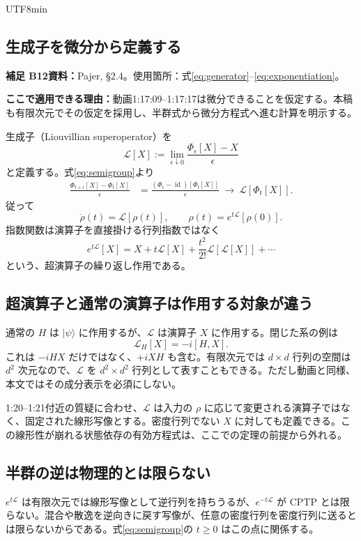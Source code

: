 \documentclass[11pt,a4paper]{article}
\numberwithin{equation}{section}
\newcommand{\id}{\operatorname{id}}
\newcommand{\ket}[1]{\lvert#1\rangle}
\newcommand{\supp}[3]{\par\smallskip\noindent\textcolor{BrickRed}{\textbf{補足 #1}}\quad\textbf{資料：}#2\par\noindent\textbf{ここで適用できる理由：}#3\par}
\begin{document}
\begin{CJK*}{UTF8}{min}
\subsection{生成子を微分から定義する}
\supp{B12}{Pajer\cite{pajer}, §2.4。使用箇所：式\eqref{eq:generator}--\eqref{eq:exponentiation}。}{動画1:17:09--1:17:17は微分できることを仮定する。本稿も有限次元でその仮定を採用し、半群式から微分方程式へ進む計算を明示する。}
生成子（Liouvillian superoperator）を
\begin{equation}
\mathcal L[X]:=\lim_{\epsilon\downarrow0}
\frac{\Phi_\epsilon[X]-X}{\epsilon}
\label{eq:generator}
\end{equation}
と定義する。式\eqref{eq:semigroup}より
\begin{align}
\frac{\Phi_{t+\epsilon}[X]-\Phi_t[X]}{\epsilon}
&=\frac{(\Phi_\epsilon-\id)[\Phi_t[X]]}{\epsilon}
\ \longrightarrow\ \mathcal L[\Phi_t[X]].
\end{align}
従って
\begin{equation}
\dot\rho(t)=\mathcal L[\rho(t)],
\qquad \rho(t)=e^{t\mathcal L}[\rho(0)].
\label{eq:exponentiation}
\end{equation}
指数関数は演算子を直接掛ける行列指数ではなく
\begin{equation}
e^{t\mathcal L}[X]=X+t\mathcal L[X]+
\frac{t^2}{2!}\mathcal L[\mathcal L[X]]+\cdots
\label{eq:super-exp}
\end{equation}
という、超演算子の繰り返し作用である。

\subsection{超演算子と通常の演算子は作用する対象が違う}
通常の $H$ は $\ket{\psi}$ に作用するが、$\mathcal L$ は演算子 $X$ に作用する。閉じた系の例は
\begin{equation}
\mathcal L_H[X]=-i[H,X].
\end{equation}
これは $-iHX$ だけではなく、$+iXH$ も含む。有限次元では $d\times d$ 行列の空間は $d^2$ 次元なので、$\mathcal L$ を $d^2\times d^2$ 行列として表すこともできる。ただし動画と同様、本文ではその成分表示を必須にしない。

1:20--1:21付近の質疑に合わせ、$\mathcal L$ は入力の $\rho$ に応じて変更される演算子ではなく、固定された線形写像とする。密度行列でない $X$ に対しても定義できる。この線形性が崩れる状態依存の有効方程式は、ここでの定理の前提から外れる。

\subsection{半群の逆は物理的とは限らない}
$e^{t\mathcal L}$ は有限次元では線形写像として逆行列を持ちうるが、$e^{-t\mathcal L}$ が CPTP とは限らない。混合や散逸を逆向きに戻す写像が、任意の密度行列を密度行列に送るとは限らないからである。式\eqref{eq:semigroup}の $t\geq0$ はこの点に関係する。


\end{CJK*}
\end{document}

